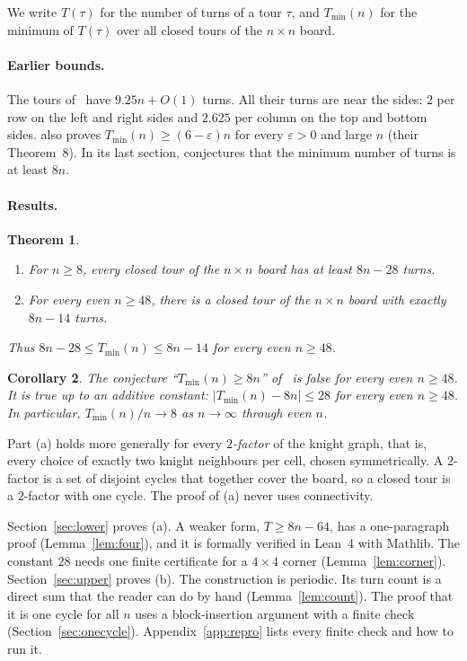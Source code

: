 \documentclass[11pt]{article}
\newtheorem{theorem}{Theorem}
\newtheorem{corollary}[theorem]{Corollary}
\theoremstyle{definition}
\theoremstyle{remark}
\newcommand{\Tmin}{T_{\min}}
\begin{document}
We write $T(\tau)$ for the number of turns of a tour $\tau$, and $\Tmin(n)$ for the minimum of $T(\tau)$ over all closed tours of the $n\times n$ board.

\paragraph{Earlier bounds.}
The tours of~\cite{bjmow} have $9.25n+O(1)$ turns.
All their turns are near the sides: $2$ per row on the left and right sides and $2.625$ per column on the top and bottom sides.
\cite{bjmow} also proves $\Tmin(n)\ge(6-\varepsilon)n$ for every $\varepsilon>0$ and large $n$ (their Theorem~8).
In its last section, \cite{bjmow} conjectures that the minimum number of turns is at least $8n$.

\paragraph{Results.}

\begin{theorem}\label{thm:main}
\begin{enumerate}
\item[(a)] For $n\ge 8$, every closed tour of the $n\times n$ board has at least $8n-28$ turns.
\item[(b)] For every even $n\ge 48$, there is a closed tour of the $n\times n$ board with exactly $8n-14$ turns.
\end{enumerate}
Thus $8n-28\le \Tmin(n)\le 8n-14$ for every even $n\ge 48$.
\end{theorem}

\begin{corollary}\label{cor:conj}
The conjecture ``$\Tmin(n)\ge 8n$'' of~\cite{bjmow} is false for every even $n\ge 48$.
It is true up to an additive constant: $|\Tmin(n)-8n|\le 28$ for every even $n\ge 48$.
In particular, $\Tmin(n)/n\to 8$ as $n\to\infty$ through even $n$.
\end{corollary}

Part (a) holds more generally for every \emph{$2$-factor} of the knight graph, that is, every choice of exactly two knight neighbours per cell, chosen symmetrically.
A $2$-factor is a set of disjoint cycles that together cover the board, so a closed tour is a $2$-factor with one cycle.
The proof of (a) never uses connectivity.

Section~\ref{sec:lower} proves (a).
A weaker form, $T\ge 8n-64$, has a one-paragraph proof (Lemma~\ref{lem:four}), and it is formally verified in Lean~4 with Mathlib.
The constant $28$ needs one finite certificate for a $4\times4$ corner (Lemma~\ref{lem:corner}).
Section~\ref{sec:upper} proves (b).
The construction is periodic.
Its turn count is a direct sum that the reader can do by hand (Lemma~\ref{lem:count}).
The proof that it is one cycle for all $n$ uses a block-insertion argument with a finite check (Section~\ref{sec:onecycle}).
Appendix~\ref{app:repro} lists every finite check and how to run it.
\end{document}
